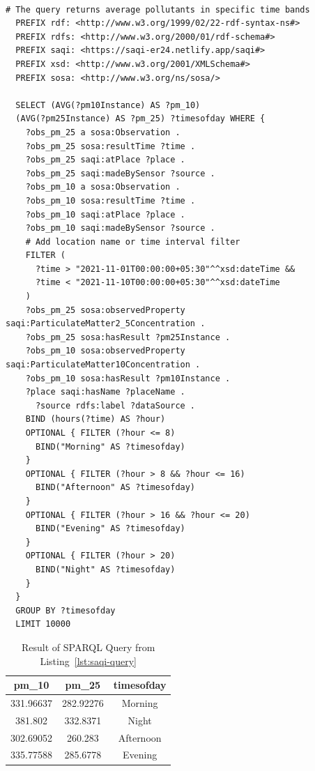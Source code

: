  \begin{lstlisting}[label=lst:saqi-query,caption={An example of a SPARQL query used by saqi; output of this query is present in Table~\protect\ref{saqi-query-result}},float,frame=tb,captionpos=b,basicstyle=\ttfamily\small]
 
# The query returns average pollutants in specific time bands
  PREFIX rdf: <http://www.w3.org/1999/02/22-rdf-syntax-ns#>
  PREFIX rdfs: <http://www.w3.org/2000/01/rdf-schema#>
  PREFIX saqi: <https://saqi-er24.netlify.app/saqi#>
  PREFIX xsd: <http://www.w3.org/2001/XMLSchema#>
  PREFIX sosa: <http://www.w3.org/ns/sosa/>
  
  SELECT (AVG(?pm10Instance) AS ?pm_10) 
  (AVG(?pm25Instance) AS ?pm_25) ?timesofday WHERE {
    ?obs_pm_25 a sosa:Observation .
    ?obs_pm_25 sosa:resultTime ?time .
    ?obs_pm_25 saqi:atPlace ?place .
    ?obs_pm_25 saqi:madeBySensor ?source .
    ?obs_pm_10 a sosa:Observation .
    ?obs_pm_10 sosa:resultTime ?time .
    ?obs_pm_10 saqi:atPlace ?place .
    ?obs_pm_10 saqi:madeBySensor ?source .
  	# Add location name or time interval filter
    FILTER (
      ?time > "2021-11-01T00:00:00+05:30"^^xsd:dateTime &&
      ?time < "2021-11-10T00:00:00+05:30"^^xsd:dateTime
    )
    ?obs_pm_25 sosa:observedProperty saqi:ParticulateMatter2_5Concentration .
    ?obs_pm_25 sosa:hasResult ?pm25Instance .
    ?obs_pm_10 sosa:observedProperty saqi:ParticulateMatter10Concentration .
    ?obs_pm_10 sosa:hasResult ?pm10Instance .
  	?place saqi:hasName ?placeName .
	  ?source rdfs:label ?dataSource .
    BIND (hours(?time) AS ?hour)
    OPTIONAL { FILTER (?hour <= 8)
      BIND("Morning" AS ?timesofday)
    }
    OPTIONAL { FILTER (?hour > 8 && ?hour <= 16)
      BIND("Afternoon" AS ?timesofday)
    }
    OPTIONAL { FILTER (?hour > 16 && ?hour <= 20)
      BIND("Evening" AS ?timesofday)
    }
    OPTIONAL { FILTER (?hour > 20)
      BIND("Night" AS ?timesofday)
    }
  } 
  GROUP BY ?timesofday
  LIMIT 10000
\end{lstlisting}

\begin{table}[!h]
\begin{center}
\caption{Result of SPARQL Query from Listing~\ref{lst:saqi-query}}
\label{saqi-query-result}
\begin{tabular}{|c c c|} 
 \hline
 pm\_10 & pm\_25 & timesofday \\ [0.5ex] 
 \hline\hline
 331.96637 & 282.92276 & Morning \\ 
 \hline
 381.802 & 332.8371 & Night \\
 \hline
 302.69052 & 260.283 & Afternoon \\
 \hline
 335.77588 & 285.6778 & Evening \\ [1ex] 
 \hline
\end{tabular}
\end{center}
\end{table}

